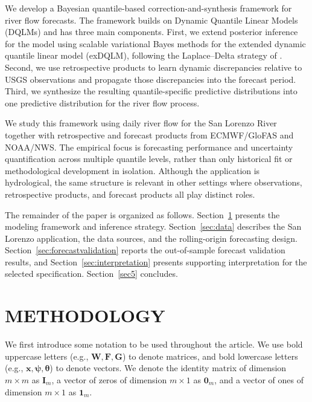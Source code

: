 \documentclass[APA,STIX1COL]{WileyNJD-v2}
\begin{document}
We develop a Bayesian quantile-based correction-and-synthesis framework for river flow forecasts. The framework builds on Dynamic Quantile Linear Models (DQLMs) \citep{goncalves, gourieroux2008dqlm, barata2021_flex_quantile} and has three main components. First, we extend posterior inference for the model using scalable variational Bayes methods for the extended dynamic quantile linear model (exDQLM), following the Laplace--Delta strategy of \citet{wang2013nonconjugatevb}. Second, we use retrospective products to learn dynamic discrepancies relative to USGS observations and propagate those discrepancies into the forecast period. Third, we synthesize the resulting quantile-specific predictive distributions into one predictive distribution for the river flow process.

We study this framework using daily river flow for the San Lorenzo River together with retrospective and forecast products from ECMWF/GloFAS and NOAA/NWS. The empirical focus is forecasting performance and uncertainty quantification across multiple quantile levels, rather than only historical fit or methodological development in isolation. Although the application is hydrological, the same structure is relevant in other settings where observations, retrospective products, and forecast products all play distinct roles.

The remainder of the paper is organized as follows. Section~\ref{sec:methodology} presents the modeling framework and inference strategy. Section~\ref{sec:data} describes the San Lorenzo application, the data sources, and the rolling-origin forecasting design. Section~\ref{sec:forecastvalidation} reports the out-of-sample forecast validation results, and Section~\ref{sec:interpretation} presents supporting interpretation for the selected specification. Section~\ref{sec5} concludes.

\section{METHODOLOGY}
\label{sec:methodology}

We first introduce some notation to be used throughout the article. We use bold uppercase letters (e.g., $\mathbf{W}, \mathbf{F}, \mathbf{G}$) to denote matrices, and bold lowercase letters (e.g., $\mathbf{x}, \mathbf{\psi}, \mathbf{\theta}$) to denote vectors. We denote the identity matrix of dimension $m \times m$ as $\mathbf{I}_m$, a vector of zeros of dimension $m \times 1$ as $\mathbf{0}_m$, and a vector of ones of dimension $m \times 1$ as $\mathbf{1}_m$.
\end{document}
